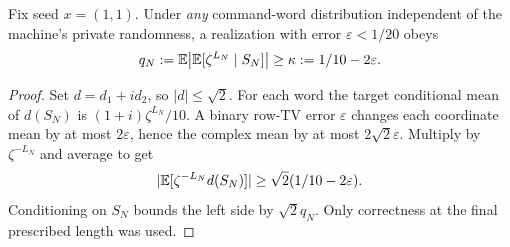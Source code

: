 \begin{lemma}\label{lem:terminal}
Fix seed $x=(1,1)$. Under \emph{any} command-word distribution independent
of the machine's private randomness, a realization with error
$\varepsilon<1/20$ obeys
\begin{equation}\label{eq:calibration}
 q_N:=\mathbb E\bigl|\mathbb E[\zeta^{L_N}\mid S_N]\bigr|
                  \ge\kappa:=1/10-2\varepsilon.
\end{equation}
\end{lemma}
\begin{proof}
Set $d=d_1+i d_2$, so $|d|\le\sqrt2$. For each word the target
conditional mean of $d(S_N)$ is $(1+i)\zeta^{L_N}/10$.
A binary row-TV error $\varepsilon$ changes each coordinate mean by
at most $2\varepsilon$, hence the complex mean by at most
$2\sqrt2\varepsilon$. Multiply by $\zeta^{-L_N}$ and average to get
\[
 |\mathbb E[\zeta^{-L_N}d(S_N)]|
      \ge\sqrt2(1/10-2\varepsilon).
\]
Conditioning on $S_N$ bounds the left side by $\sqrt2q_N$.
Only correctness at the final prescribed length was used.
\end{proof}

